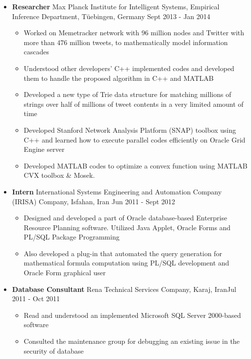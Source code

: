 \documentclass[letter]{res}
\begin{document}
\begin{resume}
\begin{itemize}[leftmargin=-.1in]
			\item \textbf{Researcher} \newline
			Max Planck Institute for Intelligent Systems, Empirical Inference Department, Tüebingen, Germany \hfill {\footnotesize Sept 2013 - Jan 2014}\\
			\vspace{-4mm}
			\iflong
			\begin{itemize}
				\item Worked on Memetracker network with 96 million nodes and Twitter with more than 476 million tweets, to mathematically model information cascades
				\item Understood other developers' C++ implemented codes and developed them to handle the proposed algorithm in C++ and MATLAB
				\item Developed a new type of Trie data structure for matching millions of strings over half of millions of tweet contents in a very limited amount of time
				\item Developed Stanford Network Analysis Platform (SNAP) toolbox using C++ and learned how to execute parallel codes efficiently on Oracle Grid Engine server
				\item Developed MATLAB codes to optimize a convex function using MATLAB CVX toolbox \& Mosek.
			\end{itemize}
			\fi
			
			\item \textbf{Intern} \newline
			International Systems Engineering and Automation Company (IRISA) Company, Isfahan, Iran \hfill Jun 2011 - Sept 2012\\
			\vspace{-4mm}
			\iflong
			\begin{itemize}
				\item Designed and developed a part of Oracle database-based Enterprise Resource Planning software. Utilized Java Applet, Oracle Forms and PL/SQL Package Programming
				\item Also developed a plug-in that automated the query generation for mathematical formula computation using PL/SQL development and Oracle Form graphical user
			\end{itemize}
			\fi
			
			\item \textbf{Database Consultant}
			\newline
			Rena Technical Services Company, Karaj, Iran\hfill Jul 2011 - Oct 2011\\
			\vspace{-4mm}
			\iflong
			\begin{itemize}
				\item Read and understood an implemented Microsoft SQL Server 2000-based software
				\item Consulted the maintenance group for debugging an existing issue in the security of database
			\end{itemize}
			\fi
		\end{itemize}
		

\end{resume}
\end{document}
